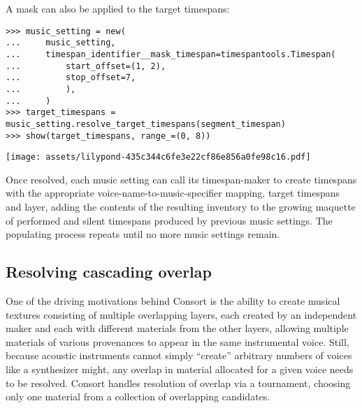 \noindent A mask can also be applied to the target timespans:

\begin{comment}
<abjad>
music_setting = new(
    music_setting,
    timespan_identifier__mask_timespan=timespantools.Timespan(
        start_offset=(1, 2),
        stop_offset=7,
        ),
    )
target_timespans = music_setting.resolve_target_timespans(segment_timespan)
show(target_timespans, range_=(0, 8))
</abjad>
\end{comment}

\begin{abjadbookoutput}
\begin{singlespacing}
\vspace{-0.5\baselineskip}
\begin{lstlisting}
>>> music_setting = new(
...     music_setting,
...     timespan_identifier__mask_timespan=timespantools.Timespan(
...         start_offset=(1, 2),
...         stop_offset=7,
...         ),
...     )
>>> target_timespans = music_setting.resolve_target_timespans(segment_timespan)
>>> show(target_timespans, range_=(0, 8))
\end{lstlisting}
\noindent\texttt{[image: assets/lilypond-435c344c6fe3e22cf86e856a0fe98c16.pdf]}
\end{singlespacing}
\end{abjadbookoutput}

\noindent Once resolved, each music setting can call its timespan-maker to
create timespans with the appropriate voice-name-to-music-specifier mapping,
target timespans and layer, adding the contents of the resulting inventory to
the growing maquette of performed and silent timespans produced by previous
music settings. The populating process repeats until no more music settings
remain.

\subsection{Resolving cascading overlap}
\label{ssec:resolving-cascading-overlap}

One of the driving motivations behind Consort is the ability to create musical
textures consisting of multiple overlapping layers, each created by an
independent maker and each with different materials from the other layers,
allowing multiple materials of various provenances to appear in the same
instrumental voice. Still, because acoustic instruments cannot simply
\enquote{create} arbitrary numbers of voices like a synthesizer might, any
overlap in material allocated for a given voice needs to be resolved. Consort
handles resolution of overlap via a tournament, choosing only one material from
a collection of overlapping candidates.

